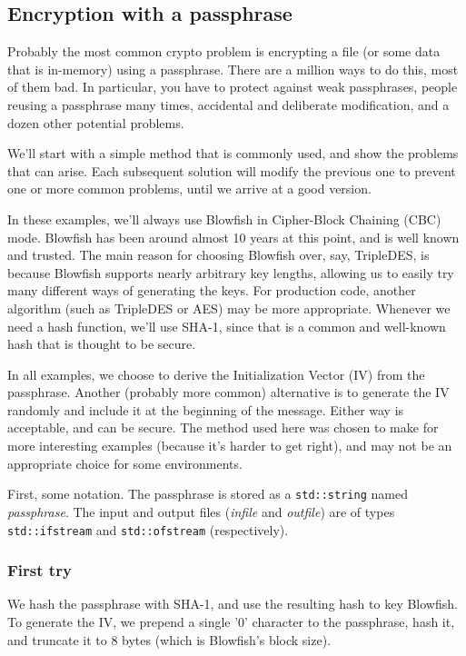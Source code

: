 \documentclass{article}
\newcommand{\type}[1]{\texttt{#1}}
\newcommand{\variable}[1]{\textsl{#1}}
\begin{document}
\subsection{Encryption with a passphrase}

Probably the most common crypto problem is encrypting a file (or some data that
is in-memory) using a passphrase. There are a million ways to do this, most of
them bad. In particular, you have to protect against weak passphrases,
people reusing a passphrase many times, accidental and deliberate modification,
and a dozen other potential problems.

We'll start with a simple method that is commonly used, and show the problems
that can arise. Each subsequent solution will modify the previous one to
prevent one or more common problems, until we arrive at a good version.

In these examples, we'll always use Blowfish in Cipher-Block Chaining (CBC)
mode. Blowfish has been around almost 10 years at this point, and is well known
and trusted. The main reason for choosing Blowfish over, say, TripleDES, is
because Blowfish supports nearly arbitrary key lengths, allowing us to easily
try many different ways of generating the keys. For production code, another
algorithm (such as TripleDES or AES) may be more appropriate. Whenever we need a
hash function, we'll use SHA-1, since that is a common and well-known hash that
is thought to be secure.

In all examples, we choose to derive the Initialization Vector (IV) from the
passphrase. Another (probably more common) alternative is to generate the IV
randomly and include it at the beginning of the message. Either way is
acceptable, and can be secure. The method used here was chosen to make for more
interesting examples (because it's harder to get right), and may not be an
appropriate choice for some environments.

First, some notation. The passphrase is stored as a \type{std::string} named
\variable{passphrase}. The input and output files (\variable{infile} and
\variable{outfile}) are of types \type{std::ifstream} and \type{std::ofstream}
(respectively).

\subsubsection{First try}

We hash the passphrase with SHA-1, and use the resulting hash to key Blowfish.
To generate the IV, we prepend a single '0' character to the passphrase, hash
it, and truncate it to 8 bytes (which is Blowfish's block size).
\end{document}
